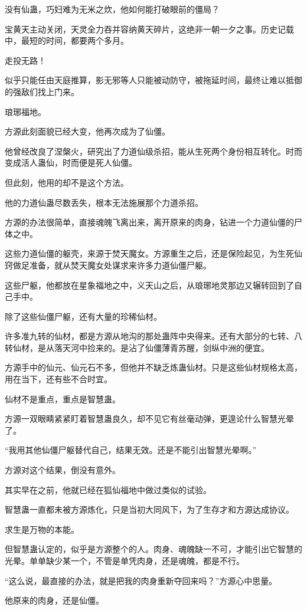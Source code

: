 \begin{this_body}
没有仙蛊，巧妇难为无米之炊，他如何能打破眼前的僵局？

宝黄天主动关闭，天灵全力吞并容纳黄天碎片，这绝非一朝一夕之事。历史记载中，最短的时间，都要两个多月。

走投无路！

似乎只能任由天庭推算，影无邪等人只能被动防守，被拖延时间，最终让难以抵御的强敌们找上门来。

琅琊福地。

方源此刻面貌已经大变，他再次成为了仙僵。

他曾经改良了涅槃火，研究出了力道仙级杀招，能从生死两个身份相互转化。时而变成活人蛊仙，时而便是死人仙僵。

但此刻，他用的却不是这个方法。

他的力道仙蛊尽数丢失，根本无法施展那个力道杀招。

方源的办法很简单，直接魂魄飞离出来，离开原来的肉身，钻进一个力道仙僵的尸体之中。

这些力道仙僵的躯壳，来源于焚天魔女。方源重生之后，还是保险起见，为生死仙窍做足准备，就从焚天魔女处谋求来许多力道仙僵尸躯。

这些尸躯，他都放在星象福地之中，义天山之后，从琅琊地灵那边又辗转回到了自己手中。

除了这些仙僵尸躯，还有大量的珍稀仙材。

许多准九转的仙材，都是方源从地沟的那处蛊阵中央得来。还有大部分的七转、八转仙材，是从落天河中捡来的。是沾了仙僵薄青苏醒，剑纵中洲的便宜。

方源手中的仙元、仙元石不多，但他并不缺乏炼蛊仙材。只是这些仙材规格太高，用在当下，还有些不合时宜。

仙材不是重点，重点是智慧蛊。

方源一双眼睛紧紧盯着智慧蛊良久，却不见它有丝毫动弹，更遑论什么智慧光晕了。

“我用其他仙僵尸躯替代自己，结果无效。还是不能引出智慧光晕啊。”

方源对这个结果，倒没有意外。

其实早在之前，他就已经在狐仙福地中做过类似的试验。

智慧蛊一直都未被方源炼化，只是当初大同风下，为了生存才和方源达成协议。

求生是万物的本能。

但智慧蛊认定的，似乎是方源整个的人。肉身、魂魄缺一不可，才能引出它智慧的光晕。单单缺少某一个，不管是单凭肉身，还是魂魄，都是不行。

“这么说，最直接的办法，就是把我的肉身重新夺回来吗？”方源心中思量。

他原来的肉身，还是仙僵。


\end{this_body}

